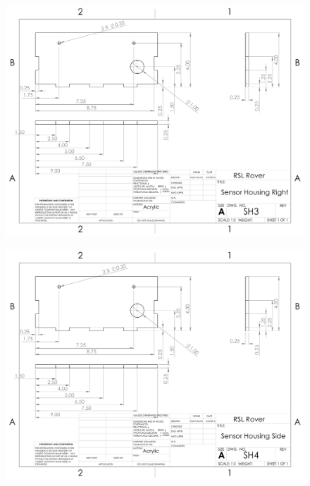 \begin{figure}[H]
	\centerline{\includegraphics[angle=90,width=1.1\linewidth]{dwgs/SH3.pdf}}
\end{figure}

\begin{figure}[H]
	\centerline{\includegraphics[angle=90,width=1.1\linewidth]{dwgs/SH4.pdf}}
\end{figure}

